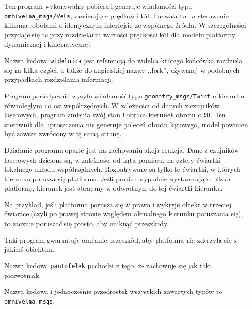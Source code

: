 	Ten program wykonywalny pobiera i generuje wiadomości typu \texttt{omnivelma\_msgs/Vels}, zawierające prędkości kół.
	Pozwala to na sterowanie kilkoma robotami o identycznym interfejsie ze wspólnego źródła.
	W szczególności przydaje się to przy rozdzielaniu wartości prędkości kół dla modelu platformy dynamicznej i kinematycznej.
	
	Nazwa kodowa \texttt{widelnica} jest referencją do widelca którego końcówka rozdziela się na kilka części, a także do angielskiej nazwy ,,fork'', używanej w podobnych 
	przypadkach rozdzielania informacji.
	
	Program periodycznie wysyła wiadomość typu \texttt{geometry\_msgs/Twist} o kierunku równoległym do osi współrzędnych.
	W zależności od danych z czujników laserowych, program zmienia swój stan i obraca kierunek obrotu o 90\textdegree.
	Ten sterownik dla uproszczenia nie generuje poleceń obrotu kątowego, model powinien być zawsze zwrócony w tę samą stronę.
	
	Działanie programu oparte jest na zachowaniu akcja-reakcja.
	Dane z czujników laserowych dzielone są, w zależności od kąta pomiaru, na cztery ćwiartki lokalnego układu współrzędnych.
	Rozpatrywane są tylko te ćwiartki, w których kierunku porusza się platforma.
	Jeśli pomiar wypadnie wystarczająco blisko platformy, kierunek jest obracany w odwrotnym do tej ćwiartki kierunku.
	
	Na przykład, jeśli platforma porusza się w prawo i wykryje obiekt w trzeciej ćwiartce (czyli po prawej stronie względem aktualnego kierunku poruszania się),
	to zacznie poruszać się prosto, aby uniknąć przeszkody.
	
	Taki program gwarantuje omijanie przeszkód, aby platforma nie zderzyła się z jakimś obiektem.
	
	Nazwa kodowa \texttt{pantofelek} pochodzi z tego, że zachowuje się jak taki pierwotniak.
	
	Nazwa kodowa i jednocześnie przedrostek wszystkich zawartych typów to \texttt{omnivelma\_msgs}.
